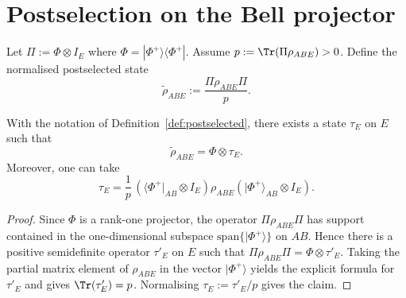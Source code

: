 \section{Postselection on the Bell projector}

\begin{definition}
\label{def:postselected}
\notready
Let $\Pi:=\Phi\otimes I_E$ where $\Phi=|\Phi^+\rangle\!\langle\Phi^+|$.
Assume $p:=\Tr(\Pi\rho_{ABE})>0$.
Define the normalised postselected state
\[
\widetilde\rho_{ABE} := \frac{\Pi\rho_{ABE}\Pi}{p}.
\]
\end{definition}

\begin{lemma}
\label{lem:postselect-factor}
\notready
With the notation of Definition~\ref{def:postselected}, there exists a state $\tau_E$ on $E$ such that
\[
\widetilde\rho_{ABE} = \Phi\otimes \tau_E.
\]
Moreover, one can take
\[
\tau_E = \frac{1}{p}\,(\langle\Phi^+|_{AB}\otimes I_E)\rho_{ABE}(|\Phi^+\rangle_{AB}\otimes I_E).
\]
\end{lemma}

\begin{proof}
Since $\Phi$ is a rank-one projector, the operator $\Pi\rho_{ABE}\Pi$ has support contained in the one-dimensional subspace $\mathrm{span}\{|\Phi^+\rangle\}$ on $AB$. Hence there is a positive semidefinite operator $\tau'_E$ on $E$ such that
\(
\Pi\rho_{ABE}\Pi=\Phi\otimes\tau'_E
\).
Taking the partial matrix element of $\rho_{ABE}$ in the vector $|\Phi^+\rangle$ yields the explicit formula for $\tau'_E$ and gives $\Tr(\tau'_E)=p$. Normalising $\tau_E:=\tau'_E/p$ gives the claim.
\end{proof}
